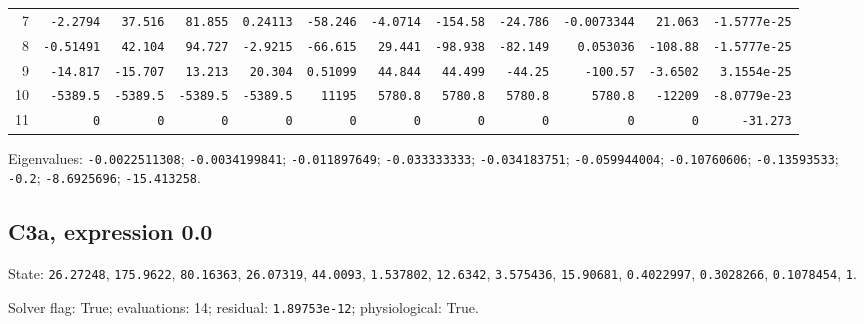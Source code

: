 \begin{landscape}
\begin{tabular}{rrrrrrrrrrrr}
7 & \texttt{-2.2794} & \texttt{37.516} & \texttt{81.855} & \texttt{0.24113} & \texttt{-58.246} & \texttt{-4.0714} & \texttt{-154.58} & \texttt{-24.786} & \texttt{-0.0073344} & \texttt{21.063} & \texttt{-1.5777e-25} \\

8 & \texttt{-0.51491} & \texttt{42.104} & \texttt{94.727} & \texttt{-2.9215} & \texttt{-66.615} & \texttt{29.441} & \texttt{-98.938} & \texttt{-82.149} & \texttt{0.053036} & \texttt{-108.88} & \texttt{-1.5777e-25} \\

9 & \texttt{-14.817} & \texttt{-15.707} & \texttt{13.213} & \texttt{20.304} & \texttt{0.51099} & \texttt{44.844} & \texttt{44.499} & \texttt{-44.25} & \texttt{-100.57} & \texttt{-3.6502} & \texttt{3.1554e-25} \\

10 & \texttt{-5389.5} & \texttt{-5389.5} & \texttt{-5389.5} & \texttt{-5389.5} & \texttt{11195} & \texttt{5780.8} & \texttt{5780.8} & \texttt{5780.8} & \texttt{5780.8} & \texttt{-12209} & \texttt{-8.0779e-23} \\

11 & \texttt{0} & \texttt{0} & \texttt{0} & \texttt{0} & \texttt{0} & \texttt{0} & \texttt{0} & \texttt{0} & \texttt{0} & \texttt{0} & \texttt{-31.273} \\

\bottomrule\end{tabular}\par\endgroup

{\scriptsize Eigenvalues: \texttt{-0.0022511308}; \texttt{-0.0034199841}; \texttt{-0.011897649}; \texttt{-0.033333333}; \texttt{-0.034183751}; \texttt{-0.059944004}; \texttt{-0.10760606}; \texttt{-0.13593533}; \texttt{-0.2}; \texttt{-8.6925696}; \texttt{-15.413258}.\par}

\clearpage
\subsection*{C3a, expression 0.0}
{\scriptsize State: \texttt{26.27248}, \texttt{175.9622}, \texttt{80.16363}, \texttt{26.07319}, \texttt{44.0093}, \texttt{1.537802}, \texttt{12.6342}, \texttt{3.575436}, \texttt{15.90681}, \texttt{0.4022997}, \texttt{0.3028266}, \texttt{0.1078454}, \texttt{1}.\par

Solver flag: True; evaluations: 14; residual: \texttt{1.89753e-12}; physiological: True.\par}


\end{landscape}
